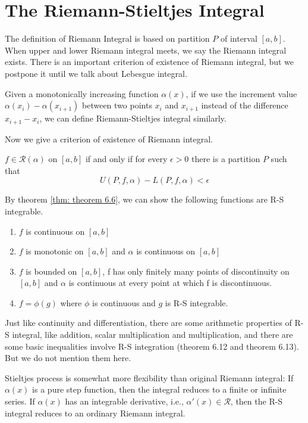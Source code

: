 \chapter{The Riemann-Stieltjes Integral}
The definition of Riemann Integral is based on partition $P$ of interval $[a,b]$. When upper and lower Riemann integral meets, we say the Riemann integral exists. There is an important criterion of existence of Riemann integral, but we postpone it until we talk about Lebesgue integral.\par
Given a monotonically increasing function $\alpha(x)$, if we use the increment value $\alpha(x_i)-\alpha(x_{i+1})$ between two points $x_i$ and $x_{i+1}$ instead of the difference $x_{i+1}-x_i$, we can define Riemann-Stieltjes integral similarly.\par
Now we give a criterion of existence of Riemann integral. 
\begin{theorem}\label{thm: theorem 6.6}
    $f\in\mathscr{R}(\alpha)$ on $[a,b]$ if and only if for every $\epsilon>0$ there is a partition $P$ such that
    \begin{equation*}
        U(P,f,\alpha)-L(P,f,\alpha)<\epsilon
    \end{equation*}
\end{theorem}
By theorem \ref{thm: theorem 6.6}, we can show the following functions are R-S integrable.
\begin{enumerate}
    \item $f$ is continuous on $[a,b]$
    \item $f$ is monotonic on $[a,b]$ and $\alpha$ is continuous on $[a,b]$
    \item $f$ is bounded on $[a,b]$, f has only finitely many points of discontinuity on $[a,b]$ and $\alpha$ is continuous at every point at which f is discontinuous.
    \item $f=\phi(g)$ where $\phi$ is continuous and $g$ is R-S integrable.
\end{enumerate}
Just like continuity and differentiation, there are some arithmetic properties of R-S integral, like addition, scalar multiplication and multiplication, and there are some basic inequalities involve R-S integration (theorem 6.12 and theorem 6.13). But we do not mention them here.\par
Stieltjes process is somewhat more flexibility than original Riemann integral: If $\alpha(x)$ is a pure step function, then the integral reduces to a finite or infinite series. If $\alpha(x)$ has an integrable derivative, i.e., $\alpha'(x)\in\mathscr{R}$, then the R-S integral reduces to an ordinary Riemann integral.\par
